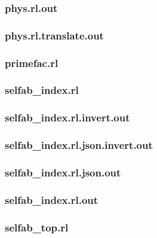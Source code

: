 \subsubsection{phys.rl.out}
\label{app:phys_rl.out}

\subsubsection{phys.rl.translate.out}
\label{app:phys_rl.translate.out}

\subsubsection{primefac.rl}
\label{app:primefac_rl}

\subsubsection{selfab\_index.rl}
\label{app:selfab_index_rl}

\subsubsection{selfab\_index.rl.invert.out}
\label{app:selfab_index_rl.invert.out}

\subsubsection{selfab\_index.rl.json.invert.out}
\label{app:selfab_index_rl.json.invert.out}

\subsubsection{selfab\_index.rl.json.out}
\label{app:selfab_index_rl.json.out}

\subsubsection{selfab\_index.rl.out}
\label{app:selfab_index_rl.out}

\subsubsection{selfab\_top.rl}
\label{app:selfab_top_rl}

